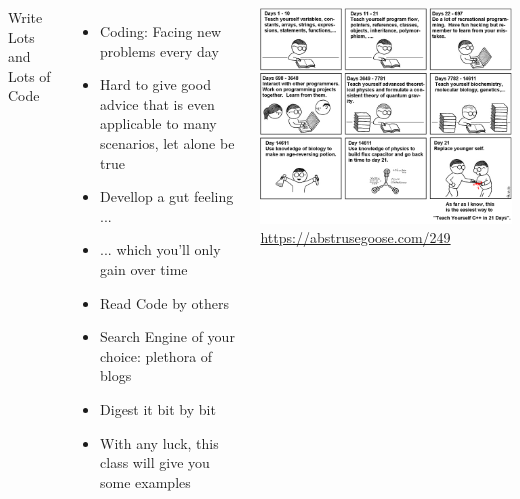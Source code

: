 \begin{frame}
%
\begin{columns}[T]
\begin{Large}
	{Write Lots and Lots of Code}
	\vspace{6pt}
\end{Large}
%
\begin{itemize}
\item Coding: Facing new problems every day
\item Hard to give good advice that is even applicable to many scenarios, let alone be true
\item Devellop a gut feeling ...
\item ... which you'll only gain over time
\item Read Code by others
\item Search Engine of your choice: plethora of blogs
\item Digest it bit by bit
\item With any luck, this class will give you some examples
\end{itemize}
%
\includegraphics[width=\linewidth]{./gfx/agoose-249}
\url{https://abstrusegoose.com/249}
\end{columns}
%
\end{frame}